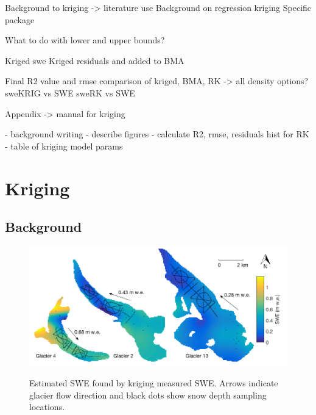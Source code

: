 \documentclass[12pt]{article}
\newcommand{\topomap}{Arrows indicate glacier flow direction and black dots show snow depth sampling locations. }
\begin{document}
Background to kriging -> literature use 
Background on regression kriging 
Specific package

What to do with lower and upper bounds?

Kriged swe
Kriged residuals and added to BMA

Final R2 value and rmse comparison of kriged, BMA, RK -> all density options?
sweKRIG vs SWE
sweRK vs SWE


Appendix -> manual for kriging 


- background writing
- describe figures
- calculate R2, rmse, residuals hist for RK
- table of kriging model params 



\section{Kriging}

\subsection{Background}


\begin{figure}
	\centering
	\includegraphics[width = \textwidth]{sweKriged.png}\\
	\caption{Estimated SWE found by kriging measured SWE. \topomap}
	\label{fig:sweKRIGING}
\end{figure}
\end{document}

